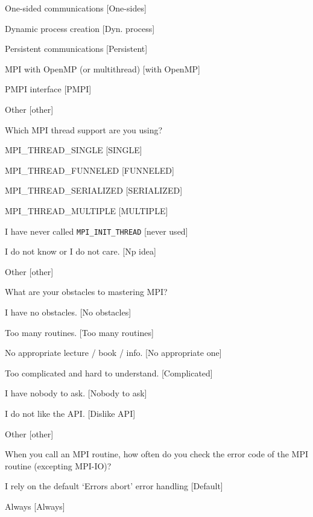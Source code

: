 \documentclass[preprint,5p,times]{elsarticle}
\begin{document}
{\begin{description}
\begin{inparaenum}[{\bf C}1)]
    \item One-sided communications [One-sides]
    \item Dynamic process creation [Dyn. process]
    \item Persistent communications [Persistent]
    \item MPI with OpenMP (or multithread) [with OpenMP]
    \item PMPI interface [PMPI]
    \item Other [other]
    \end{inparaenum}
  \item[Q18*:] Which MPI thread support are you using?
    \begin{inparaenum}[{\bf C}1)]
    \item MPI\_THREAD\_SINGLE [SINGLE]
    \item MPI\_THREAD\_FUNNELED [FUNNELED]
    \item MPI\_THREAD\_SERIALIZED [SERIALIZED]
    \item MPI\_THREAD\_MULTIPLE [MULTIPLE]
    \item I have never called {\tt MPI\_INIT\_THREAD} [never used]
    \item I do not know or I do not care. [Np idea]
    \item Other [other]
    \end{inparaenum}
  \item[Q19*:] What are your obstacles to mastering MPI?
    \begin{inparaenum}[{\bf C}1)]
    \item I have no obstacles. [No obstacles]
    \item Too many routines. [Too many routines]
    \item No appropriate lecture / book / info. [No appropriate one]
    \item Too complicated and hard to understand. [Complicated]
    \item I have nobody to ask. [Nobody to ask]
    \item I do not like the API. [Dislike API]
    \item Other [other]
    \end{inparaenum}
  \item[Q20:] When you call an MPI routine, how often do you check the error code of the MPI routine  (excepting MPI-IO)?
    \begin{inparaenum}[{\bf C}1)]
    \item I rely on the default ‘Errors abort’ error handling [Default]
    \item Always [Always]

\end{inparaenum}
\end{description}}
\end{document}
